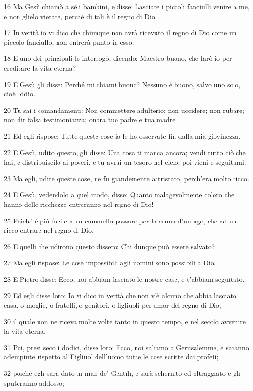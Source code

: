 \par 16 Ma Gesù chiamò a sé i bambini, e disse: Lasciate i piccoli fanciulli venire a me, e non glielo vietate, perché di tali è il regno di Dio.
\par 17 In verità io vi dico che chiunque non avrà ricevuto il regno di Dio come un piccolo fanciullo, non entrerà punto in esso.
\par 18 E uno dei principali lo interrogò, dicendo: Maestro buono, che farò io per ereditare la vita eterna?
\par 19 E Gesù gli disse: Perché mi chiami buono? Nessuno è buono, salvo uno solo, cioè Iddio.
\par 20 Tu sai i comandamenti: Non commettere adulterio; non uccidere; non rubare; non dir falsa testimonianza; onora tuo padre e tua madre.
\par 21 Ed egli rispose: Tutte queste cose io le ho osservate fin dalla mia giovinezza.
\par 22 E Gesù, udito questo, gli disse: Una cosa ti manca ancora; vendi tutto ciò che hai, e distribuiscilo ai poveri, e tu avrai un tesoro nel cielo; poi vieni e seguitami.
\par 23 Ma egli, udite queste cose, ne fu grandemente attristato, perch'era molto ricco.
\par 24 E Gesù, vedendolo a quel modo, disse: Quanto malagevolmente coloro che hanno delle ricchezze entreranno nel regno di Dio!
\par 25 Poiché è più facile a un cammello passare per la cruna d'un ago, che ad un ricco entrare nel regno di Dio.
\par 26 E quelli che udirono questo dissero: Chi dunque può essere salvato?
\par 27 Ma egli rispose: Le cose impossibili agli uomini sono possibili a Dio.
\par 28 E Pietro disse: Ecco, noi abbiam lasciato le nostre case, e t'abbiam seguitato.
\par 29 Ed egli disse loro: Io vi dico in verità che non v'è alcuno che abbia lasciato casa, o moglie, o fratelli, o genitori, o figliuoli per amor del regno di Dio,
\par 30 il quale non ne riceva molte volte tanto in questo tempo, e nel secolo avvenire la vita eterna.
\par 31 Poi, presi seco i dodici, disse loro: Ecco, noi saliamo a Gerusalemme, e saranno adempiute rispetto al Figliuol dell'uomo tutte le cose scritte dai profeti;
\par 32 poiché egli sarà dato in man de' Gentili, e sarà schernito ed oltraggiato e gli sputeranno addosso;
